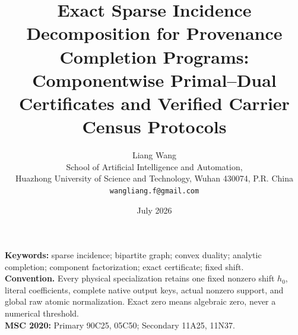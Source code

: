 \documentclass[11pt]{article}
\title{Exact Sparse Incidence Decomposition for Provenance Completion Programs:\\
Componentwise Primal--Dual Certificates and Verified Carrier Census Protocols}
\author{Liang Wang\\
School of Artificial Intelligence and Automation,\\
Huazhong University of Science and Technology, Wuhan 430074, P.R. China\\
\texttt{wangliang.f@gmail.com}}
\date{July 2026}
\theoremstyle{remark}
\begin{document}
\maketitle


\noindent\textbf{Keywords:} sparse incidence; bipartite graph; convex
duality; analytic completion; component factorization; exact
certificate; fixed shift.\\[0.5em]
\noindent\textbf{Convention.} Every physical specialization retains one
fixed nonzero shift \(h_0\), literal coefficients, complete native output
keys, actual nonzero support, and global raw atomic normalization. Exact
zero means algebraic zero, never a numerical threshold.\\[0.5em]
\noindent\textbf{MSC 2020:} Primary 90C25, 05C50; Secondary 11A25, 11N37.











\begingroup
\small
\raggedright


\endgroup
\end{document}
